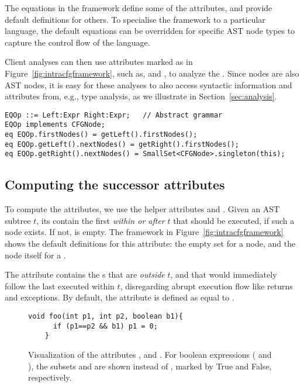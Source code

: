 The equations in the framework define some of the attributes, and provide default definitions for others.
To specialise the framework to a particular language, the default equations can be overridden for specific AST node types to capture the control flow of the language.

Client analyses can then use attributes marked as  {\dfapi} in Figure~\ref{fig:intracfgframework}, such as,  and , to analyze the {\CFG}.
Since {\CFG} nodes are also AST nodes, it is easy for these analyses to also access syntactic information and attributes from, e.g., type analysis,
as we illustrate in Section~\ref{sec:analysis}.


\begin{lstlisting}[language=JastAdd, caption=JastAdd translation of \astnode{EQOp} in Figure~\ref{fig:exampleuml}., label=listing:jastadd-eqop, captionpos=b,float=t]
EQOp ::= Left:Expr Right:Expr;   // Abstract grammar
EQOp implements CFGNode;
eq EQOp.firstNodes() = getLeft().firstNodes();
eq EQOp.getLeft().nextNodes() = getRight().firstNodes();
eq EQOp.getRight().nextNodes() = SmallSet<CFGNode>.singleton(this);
\end{lstlisting}

\subsection{Computing the successor attributes}

To compute the  attributes, we use the helper attributes  and .
Given an AST subtree $t$, its  contain the first  \emph{within or after} $t$ that should be executed, if such a node exists.
If not,  is empty.
The framework in Figure~\ref{fig:intracfgframework} shows the default definitions for this attribute: the empty set for a  node, and the node itself for a .

The  attribute contains the s that are \emph{outside} $t$, and that would immediately follow the last executed  within $t$, disregarding abrupt execution flow like returns and exceptions.
By default, the  attribute is defined as equal to .

\begin{figure*}
  \begin{lstlisting}[language=JastAdd]
    void foo(int p1, int p2, boolean b1){
      if (p1==p2 && b1) p1 = 0;
    }
    \end{lstlisting}
\centering
\scalebox{0.7}{
	
}
\caption{Visualization of the attributes ,  and . For boolean expressions ( and ), the subsets  and  are shown instead of , marked by True and False, respectively.}
\label{fig:RunningExample}
\end{figure*}


